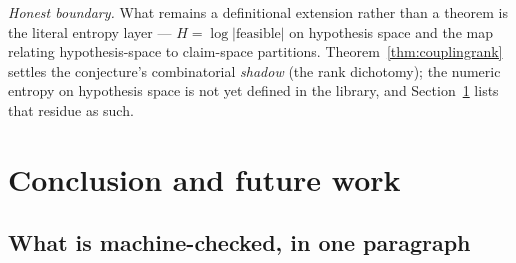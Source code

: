 \documentclass[11pt]{article}
\begin{document}
\emph{Honest boundary.}  What remains a definitional extension
rather than a theorem is the literal entropy layer --- $H = \log
\lvert\text{feasible}\rvert$ on hypothesis space and the map
relating hypothesis-space to claim-space partitions.
Theorem~\ref{thm:couplingrank} settles the conjecture's
combinatorial \emph{shadow} (the rank dichotomy); the numeric
entropy on hypothesis space is not yet defined in the library, and
Section~\ref{sec:conclusion} lists that residue as such.

\section{Conclusion and future work}
\label{sec:conclusion}

\subsection{What is machine-checked, in one paragraph}
\end{document}
